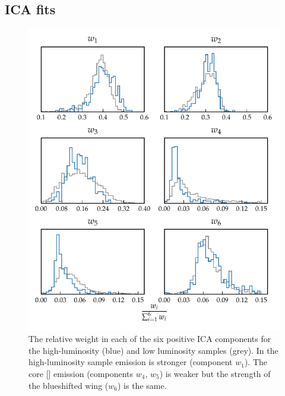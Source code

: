 \subsection{ICA fits}

\begin{figure}
\centering 
    \includegraphics[width=\textwidth]{figures/chapter04/mfica_component_weights.pdf} 
    \caption[{The relative weight in each of the six positive ICA components for the high-luminosity and low luminosity samples.}]{The relative weight in each of the six positive ICA components for the high-luminosity (blue) and low luminosity samples (grey). In the high-luminosity sample  emission is stronger (component $w_1$). The core [] emission (components $w_4$, $w_5$) is weaker but the strength of the blueshifted wing ($w_6$) is the same.}     
    \label{fig:mfica_component_weights}
\end{figure}

